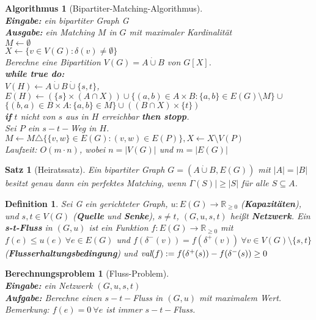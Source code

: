 \documentclass[12pt,a4paper]{article}
\theoremstyle{plain}
\newtheorem{Satz}[Theorem]{Satz}
\newtheorem{Definition}[Theorem]{Definition}
\newtheorem{Algorithmus}[Theorem]{Algorithmus}
\newtheorem{Berechnungsproblem}[Theorem]{Berechnungsproblem}
\newcommand{\herv}[1]{{\emph{\textbf{#1}}}}
\newcommand{\R}{\mathbb{R}}
\newcommand{\cupdot}{\mathbin{\dot{\cup}}}
\numberwithin{equation}{section}
\begin{document}
\begin{Algorithmus}[Bipartiter-Matching-Algorithmus]\\
\textbf{Eingabe:} ein bipartiter Graph G\\
\textbf{Ausgabe:} ein Matching $M$ in $G$ mit maximaler Kardinalität\\
$M\leftarrow \emptyset$\\
$X\leftarrow \{v\in V(G):\delta(v)\neq \emptyset\}$\\
Berechne eine Bipartition $V(G)=A\cupdot B$ von $G[X]$.\\
\textbf{while true do:}\\
\text{\qquad} $V(H) \leftarrow A\cupdot B\cupdot\{s,t\}$,\\
\text{\qquad} $E(H)\leftarrow \left( \{s\}\times (A \cap X)\right) \cup \{(a,b)\in A\times B:\{a,b\}\in E(G)\setminus M\} \cup$ \\ \text{\qquad\qquad\qquad} $ \{(b,a)\in B\times A: \{a,b\}\in M\} \cup \left( (B\cap X) \times \{t\}\right)$ \\
\text{\qquad} \textbf{if} $t$ nicht von $s$ aus in $H$ erreichbar \textbf{then stopp}.\\
\text{\qquad} Sei $P$ ein $s-t-$Weg in $H$.\\
\text{\qquad} $M\leftarrow M \triangle \{\{v,w\} \in E(G):(v,w)\in E(P)\}, X \leftarrow X \setminus V(P)$\\
Laufzeit: $O(m\cdot n)$, wobei $n=|V(G)|$ und $m=|E(G)|$
\end{Algorithmus}
\begin{Satz}[Heiratssatz]
Ein bipartiter Graph $G=(A\cupdot B, E(G))$ mit $|A|=|B|$ besitzt genau dann ein perfektes Matching, wenn $\Gamma(S)|\geq |S|$ für alle $S\subseteq A$.
\end{Satz}
\begin{Definition}
Sei G ein gerichteter Graph, $u: E(G) \rightarrow \R_{\geq 0}$ (\herv{Kapazitäten}), und $s,t\in V(G)$ (\herv{Quelle} und \herv{Senke}), $s\neq t$, $(G,u,s,t)$ heißt \herv{Netzwerk}. Ein \herv{s-t-Fluss} in $(G,u)$ ist ein Funktion $f:E(G) \rightarrow \R_{\geq 0}$ mit $f(e)\leq u(e)\ \forall e \in E(G)$ und $f(\delta^-(v))=f(\delta^+(v))\ \forall v\in V(G)\setminus\{s,t\}$ (\herv{Flusserhaltungsbedingung}) und $\emph{val}(f):= f(\delta^+(s))-f(\delta^-(s))\geq 0$
\end{Definition}
\begin{Berechnungsproblem}[Fluss-Problem]\\
\textbf{Eingabe:} ein Netzwerk $(G,u,s,t)$\\
\textbf{Aufgabe:} Berechne einen $s-t-$Fluss in $(G,u)$ mit maximalem Wert.\\
\textit{Bemerkung:} $f(e)=0\ \forall e$ ist immer $s-t-$Fluss.
\end{Berechnungsproblem}
\end{document}
